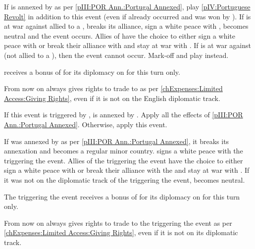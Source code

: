 
\condition{}
\aparag If \paysportugal is annexed by \HIS as per \ref{pIII:POR Ann.:Portugal
  Annexed}, play \ref{pIV:Portuguese Revolt} in addition to this event (even
if  already occurred and was won by \HIS).
\aparag If \ENG is at war against \paysportugal allied to a \MAJ, \paysportugal
breaks its alliance, sign a white peace with \ENG, becomes neutral and the
event occurs.
\bparag Allies of \ENG have the choice to either sign a white peace with
\paysportugal or break their alliance with \ENG and stay at war with
\paysportugal.
\bparag If \ENG is at war against \paysportugal (not allied to a \MAJ), then
the event cannot occur. Mark-off and play \RD instead.

\phdipl
\aparag \ENG receives a bonus of  for its diplomacy on \paysportugal
for this turn only.

\effetlong
\aparag From now on \paysportugal always gives rights to trade to \ENG as per
\ref{chExpenses:Limited Access:Giving Rights}, even if it is not on the
English diplomatic track.



\condition{}
\aparag If this event is triggered by \HIS, \paysportugal is annexed by
\HIS. Apply all the effects of \ref{pIII:POR Ann.:Portugal Annexed}.
\bparag Otherwise, apply this event.

\phevnt
\aparag If \paysportugal was annexed by \HIS as per \ref{pIII:POR
  Ann.:Portugal Annexed}, it breaks its annexation and becomes a regular minor
country.
\aparag \paysportugal signs a white peace with the \MAJ triggering the event.
\bparag Allies of the \MAJ triggering the event have the choice to either sign
a white peace with \paysportugal or break their alliance with the \MAJ and
stay at war with \paysportugal.
\aparag If it was not on the diplomatic track of the \MAJ triggering the
event, \paysportugal becomes neutral.

\phdipl
\aparag The \MAJ triggering the event receives a bonus of  for its
diplomacy on \paysportugal for this turn only.

\effetlong
\aparag From now on \paysportugal always gives rights to trade to the \MAJ
triggering the event as per \ref{chExpenses:Limited Access:Giving Rights},
even if it is not on its diplomatic track.



